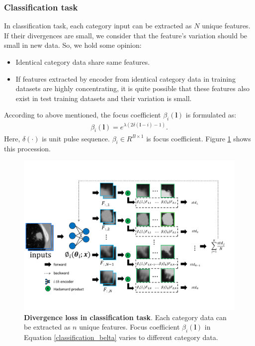 \documentclass[journal]{IEEEtran}
\begin{document}
\subsubsection{Classification task}
In classification task, each category input can be extracted as $N$ unique features. If their divergences are small, we consider that the feature's variation should be small in new data. So, we hold some opinion:
\begin{itemize}
	\item Identical category data share same features.
	\item If features extracted by encoder from identical category data in training datasets are highly concentrating, it is quite possible that these features also exist in test training datasets and their variation is small.
\end{itemize}

According to above mentioned, the focus coefficient $\beta_{i}(\boldsymbol{l})$ is formulated as:
\begin{align}\label{classification_belta}
	\beta_{i}(\boldsymbol{l})=e^{\lambda(2\delta(\boldsymbol{l}-i)-1)}.
\end{align}
Here, $\delta(\cdot)$ is unit pulse sequence. $\beta_{i}\in R^{B\times1}$ is focus coefficient. Figure \ref{fig_classification_encoder_backward} shows this procession.


\begin{figure}
	\centering
	\includegraphics[scale=0.25]{./picture/encoder_loss_backward.pdf}
	\caption{\textbf{Divergence loss in classification task}. Each category data can be extracted as $n$ unique features. Focus coefficient $\beta_{i}(\boldsymbol{l})$ in Equation \ref{classification_belta} varies to different category data.}
	\label{fig_classification_encoder_backward}
\end{figure}
\end{document}
